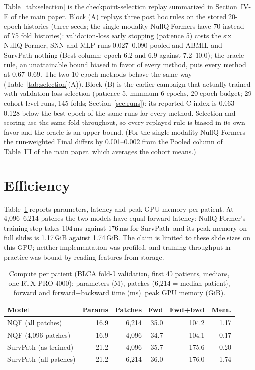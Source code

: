 \documentclass[9pt,journal]{IEEEtran}
\newcommand{\tabsize}{\scriptsize}
\newcommand{\pq}{NullQ-Former}
\newcommand{\pqf}{NQF}
\newcommand{\cindex}{C-index}
\begin{document}
Table~\ref{tab:selection} is the checkpoint-selection replay summarized in Section~IV-E of the main paper. Block (A) replays three post hoc rules on the stored 20-epoch histories (three seeds; the single-modality \pq{}s have 70 instead of 75 fold histories): validation-loss early stopping (patience 5) costs the six \pq{}, SNN and MLP runs 0.027--0.090 pooled and ABMIL and SurvPath nothing (Best column: epoch 6.2 and 6.9 against 7.2--10.0); the oracle rule, an unattainable bound biased in favor of every method, puts every method at 0.67--0.69. The two 10-epoch methods behave the same way (Table~\ref{tab:selection}(A)). Block (B) is the earlier campaign that actually trained with validation-loss selection (patience 5, minimum 6 epochs, 20-epoch budget; 29 cohort-level runs, 145 folds; Section~\ref{sec:runs}): its reported \cindex{} is 0.063--0.128 below the best epoch of the same runs for every method. Selection and scoring use the same fold throughout, so every replayed rule is biased in its own favor and the oracle is an upper bound. (For the single-modality \pq{}s the run-weighted Final differs by 0.001--0.002 from the Pooled column of Table~III of the main paper, which averages the cohort means.)

\section{Efficiency}
\label{sec:efficiency}
Table~\ref{tab:efficiency} reports parameters, latency and peak GPU memory per patient. At 4,096--6,214 patches the two models have equal forward latency; \pq{}'s training step takes 104\,ms against 176\,ms for SurvPath, and its peak memory on full slides is 1.17\,GiB against 1.74\,GiB. The claim is limited to these slide sizes on this GPU; neither implementation was profiled, and training throughput in practice was bound by reading features from storage.

\begin{table}[!t]
\caption{Compute per patient (BLCA fold-0 validation, first 40 patients, medians, one RTX PRO 4000): parameters (M), patches (6,214 = median patient), forward and forward+backward time (ms), peak GPU memory (GiB).}
\label{tab:efficiency}
\centering
\tabsize
\setlength{\tabcolsep}{3pt}
\begin{tabular}{@{}lrrrrr@{}}
\toprule
Model & Params & Patches & Fwd & Fwd+bwd & Mem. \\
\midrule
\pqf{} (all patches) & 16.9 & 6,214 & 35.0 & 104.2 & 1.17 \\
\pqf{} (4,096 patches) & 16.9 & 4,096 & 34.7 & 104.1 & 0.17 \\
SurvPath (as trained) & 21.2 & 4,096 & 35.7 & 175.6 & 0.20 \\
SurvPath (all patches) & 21.2 & 6,214 & 36.0 & 176.0 & 1.74 \\
\bottomrule
\end{tabular}
\end{table}
\end{document}
